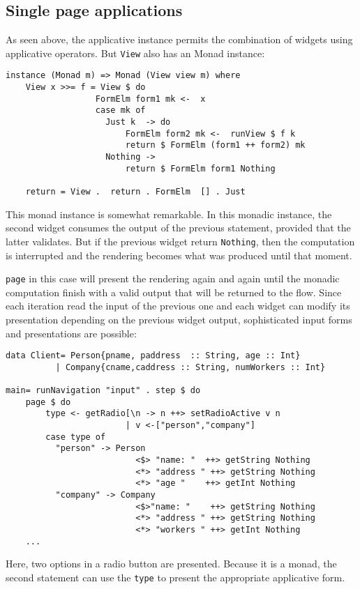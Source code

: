 \documentclass{tmr}
\begin{document}
\subsection{Single page applications} 

As seen above, the applicative instance permits the combination of widgets using applicative operators. But {\tt View} also has an Monad instance: 
 
{\tt 
 
\begin{verbatim} 
instance (Monad m) => Monad (View view m) where 
    View x >>= f = View $ do 
                  FormElm form1 mk <-  x 
                  case mk of 
                    Just k  -> do 
                        FormElm form2 mk <-  runView $ f k 
                        return $ FormElm (form1 ++ form2) mk 
                    Nothing -> 
                        return $ FormElm form1 Nothing 
 
    return = View .  return . FormElm  [] . Just 
\end{verbatim} 
 
} 
 
This monad instance is somewhat remarkable. In this monadic instance, the second widget consumes the output of the previous statement, provided that the latter validates. But if the previous widget return {\tt Nothing}, then the computation is interrupted and the rendering becomes what was produced until that moment.
 
{\tt page} in this case will present the rendering again and again until the monadic computation finish with a valid output that will be returned to the flow. Since each iteration read the input of the previous one and each widget can modify its presentation depending on the previous widget output, sophisticated input forms and presentations are possible: 
{\tt 
 
\begin{verbatim} 
data Client= Person{pname, paddress  :: String, age :: Int} 
          | Company{cname,caddress :: String, numWorkers :: Int} 
 
main= runNavigation "input" . step $ do 
    page $ do 
        type <- getRadio[\n -> n ++> setRadioActive v n 
                        | v <-["person","company"] 
        case type of 
          "person" -> Person 
                          <$> "name: "  ++> getString Nothing 
                          <*> "address " ++> getString Nothing 
                          <*> "age "    ++> getInt Nothing 
          "company" -> Company 
                          <$>"name: "    ++> getString Nothing 
                          <*> "address " ++> getString Nothing 
                          <*> "workers " ++> getInt Nothing 
    ... 
\end{verbatim} 
 
} 
Here, two options in a radio button are presented. Because it is a  monad, the second statement can use the {\tt type} to present the  appropriate applicative form. 
 
\end{document}
